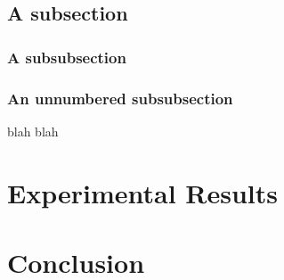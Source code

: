 \documentclass{article}
\begin{document}
\subsection{A subsection}

\subsubsection{A subsubsection}

\subsubsection*{An unnumbered subsubsection} blah blah

\section{Experimental Results}

\section{Conclusion}



\end{document}
